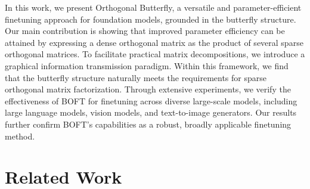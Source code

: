 In this work, we present Orthogonal Butterfly, a versatile and parameter-efficient finetuning approach for foundation models, grounded in the butterfly structure. Our main contribution is showing that improved parameter efficiency can be attained by expressing a dense orthogonal matrix as the product of several sparse orthogonal matrices. To facilitate practical matrix decompositions, we introduce a graphical information transmission paradigm. Within this framework, we find that the butterfly structure naturally meets the requirements for sparse orthogonal matrix factorization. Through extensive experiments, we verify the effectiveness of BOFT for finetuning across diverse large-scale models, including large language models, vision models, and text-to-image generators. Our results further confirm BOFT's capabilities as a robust, broadly applicable finetuning method.

\section{Related Work}

